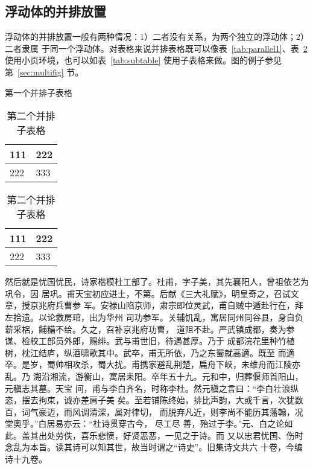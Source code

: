 \documentclass[../Main/thesis.tex]{subfiles}
\begin{document}
\subsection{浮动体的并排放置}
浮动体的并排放置一般有两种情况：1）二者没有关系，为两个独立的浮动体；2）二者隶属
于同一个浮动体。对表格来说并排表格既可以像表~\ref{tab:parallel1}、表~\ref{tab:parallel2}
使用小页环境，也可以如表~\ref{tab:subtable} 使用子表格来做。图的例子参见第~\ref{sec:multifig} 节。
\begin{table}[ht]
  \noindent\begin{minipage}{0.5\textwidth}
    \centering
    \caption{第一个并排子表格}
    \label{tab:parallel1}
    \begin{tabular}{p{2cm}p{2cm}}
      \toprule[1.5pt]
      111 & 222 \\\midrule[1pt]
      222 & 333 \\\bottomrule[1.5pt]
    \end{tabular}
  \end{minipage}
  \begin{minipage}{0.5\textwidth}
    \centering
    \caption{第二个并排子表格}
    \label{tab:parallel2}
    \begin{tabular}{p{2cm}p{2cm}}
      \toprule[1.5pt]
      111 & 222 \\\midrule[1pt]
      222 & 333 \\\bottomrule[1.5pt]
    \end{tabular}
  \end{minipage}
\end{table}

然后就是忧国忧民，诗家楷模杜工部了。杜甫，字子美，其先襄阳人，曾祖依艺为巩令，因
居巩。甫天宝初应进士，不第。后献《三大礼赋》，明皇奇之，召试文章，授京兆府兵曹参
军。安禄山陷京师，肃宗即位灵武，甫自贼中遁赴行在，拜左拾遗。以论救房琯，出为华州
司功参军。关辅饥乱，寓居同州同谷县，身自负薪采梠，餔糒不给。久之，召补京兆府功曹，
道阻不赴。严武镇成都，奏为参谋、检校工部员外郎，赐绯。武与甫世旧，待遇甚厚。乃于
成都浣花里种竹植树，枕江结庐，纵酒啸歌其中。武卒，甫无所依，乃之东蜀就高適。既至
而適卒。是岁，蜀帅相攻杀，蜀大扰。甫携家避乱荆楚，扁舟下峡，未维舟而江陵亦乱。乃
溯沿湘流，游衡山，寓居耒阳。卒年五十九。元和中，归葬偃师首阳山，元稹志其墓。天宝
间，甫与李白齐名，时称李杜。然元稹之言曰：“李白壮浪纵恣，摆去拘束，诚亦差肩子美
矣。至若铺陈终始，排比声韵，大或千言，次犹数百，词气豪迈，而风调清深，属对律切，
而脱弃凡近，则李尚不能历其藩翰，况堂奥乎。”白居易亦云：“杜诗贯穿古今，  尽工尽
善，殆过于李。”元、白之论如此。盖其出处劳佚，喜乐悲愤，好贤恶恶，一见之于诗。而
又以忠君忧国、伤时念乱为本旨。读其诗可以知其世，故当时谓之“诗史”。旧集诗文共六
十卷，今编诗十九卷。
\end{document}
